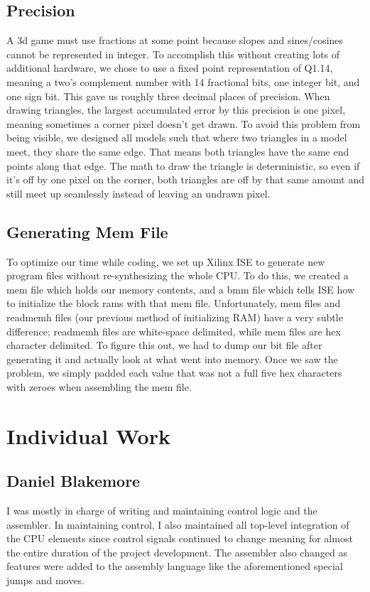 \documentclass[onecolumn]{IEEEtran}
\begin{document}
\subsection{Precision}
A 3d game must use fractions at some point because slopes and sines/cosines cannot be represented in integer.  To accomplish this without creating lots of additional hardware, we chose to use a fixed point representation of Q1.14, meaning a two’s complement number with 14 fractional bits, one integer bit, and one sign bit.  This gave us roughly three decimal places of precision.  When drawing triangles, the largest accumulated error by this precision is one pixel, meaning sometimes a corner pixel doesn’t get drawn.  To avoid this problem from being visible, we designed all models such that where two triangles in a model meet, they share the same edge.  That means both triangles have the same end points along that edge.  The math to draw the triangle is deterministic, so even if it’s off by one pixel on the corner, both triangles are off by that same amount and still meet up seamlessly instead of leaving an undrawn pixel.

\subsection{Generating Mem File}
To optimize our time while coding, we set up Xilinx ISE to generate new program files without re-synthesizing the whole CPU.  To do this, we created a mem file which holds our memory contents, and a bmm file which tells ISE how to initialize the block rams with that mem file.  Unfortunately, mem files and readmemh files (our previous method of initializing RAM) have a very subtle difference; readmemh files are white-space delimited, while mem files are hex character delimited.  To figure this out, we had to dump our bit file after generating it and actually look at what went into memory.  Once we saw the problem, we simply padded each value that was not a full five hex characters with zeroes when assembling the mem file.



\section{Individual Work}
\subsection{Daniel Blakemore}
I was mostly in charge of writing and maintaining control logic and the assembler.  In maintaining control, I also maintained all top-level integration of the CPU elements since control signals continued to change meaning for almost the entire duration of the project development.  The assembler also changed as features were added to the assembly language like the aforementioned special jumps and moves.
\end{document}
